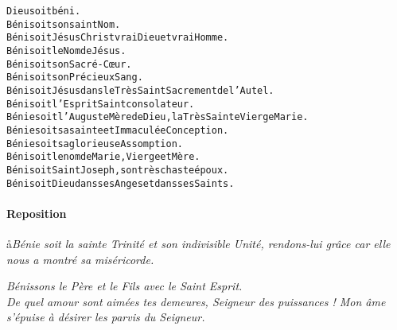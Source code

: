 \documentclass[twoside]{article}
\begin{document}
\begin{alltt}\normalfont
    Dieu soit béni.
    Béni soit son saint Nom.
    Béni soit Jésus Christ vrai Dieu et vrai Homme.
    Béni soit le Nom de Jésus.
    Béni soit son Sacré-Cœur.
    Béni soit son Précieux Sang.
    Béni soit Jésus dans le Très Saint Sacrement de l’Autel.
    Béni soit l'Esprit Saint consolateur.
    Bénie soit l’Auguste Mère de Dieu, la Très Sainte Vierge Marie.
    Bénie soit sa sainte et Immaculée Conception.
    Bénie soit sa glorieuse Assomption.
    Béni soit le nom de Marie, Vierge et Mère.
    Béni soit Saint Joseph, son très chaste époux.
    Béni soit Dieu dans ses Anges et dans ses Saints.
\end{alltt}
\newpage
\paragraph{Reposition}


\aa \emph{Bénie soit la sainte Trinité
et son indivisible Unité,
rendons-lui grâce
car elle nous a montré sa miséricorde.}

\vv \emph{Bénissons le Père et le Fils avec le Saint Esprit.}\\
\vv \emph{De quel amour sont aimées tes demeures, Seigneur des puissances ! Mon âme s'épuise à désirer les parvis du Seigneur.}
\end{document}
